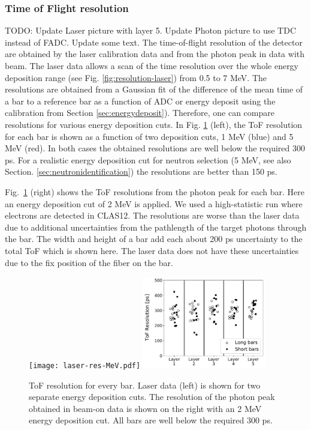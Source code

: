 \documentclass[3p,final,twocolumn]{elsarticle}
\begin{document}
\subsubsection{Time of Flight resolution}
\label{sec:tofresolution}

{\color{red} TODO: Update Laser picture with layer 5. Update Photon picture to use TDC instead of FADC. Update some text.}
The time-of-flight resolution of the detector are obtained by the laser calibration data and from the photon peak in data with beam. The laser data allows a scan of the time resolution over the whole energy deposition range (see Fig. \ref{fig:resolution-laser}) from 0.5 to 7 \si{\mega\electronvolt}. The resolutions are obtained from a Gaussian fit of the difference of the mean time of a bar to a reference bar as a function of ADC or energy deposit using the calibration from Section \ref{sec:energydeposit}). Therefore, one can compare resolutions for various energy deposition cuts. In Fig. \ref{fig:tof_resolution} (left), the ToF resolution for each bar is shown as a function of two deposition cuts, 1 \si{\mega\electronvolt} (blue) and 5 \si{\mega\electronvolt} (red). In 
both cases the obtained resolutions are well below the required 300 \si{\pico\s}. For a realistic energy deposition cut for neutron selection (5 \si{\mega\electronvolt}, see also Section. \ref{sec:neutronidentification}) the resolutions are better than 150 \si{\pico\s}.

Fig.~\ref{fig:tof_resolution} (right) shows the ToF resolutions from the photon peak for each bar. Here an energy deposition cut of 2 \si{\mega\electronvolt} is applied. We used a high-statistic run where electrons are detected in CLAS12. The resolutions are worse than the laser data due to additional uncertainties from the pathlength of the target photons through the bar. The width and height of a bar add each about 200 \si{\pico\s} uncertainty to the total ToF which is shown here. The laser data does not have these uncertainties due to the fix position of the fiber on the bar.
\begin{figure}[tb]
	\centering
			\texttt{[image: laser-res-MeV.pdf]}
		\includegraphics[width=0.48\textwidth]{tof-resolutions-photons-2MeV.pdf}
	\caption{ToF resolution for every bar. Laser data (left) is shown for two separate energy deposition cuts. The resolution of the photon peak obtained in beam-on data is shown on the right with an 2 \si{\mega\electronvolt} energy deposition cut. All bars are well below the required 300 \si{\pico\s}. }
	\label{fig:tof_resolution}
\end{figure}
\end{document}
